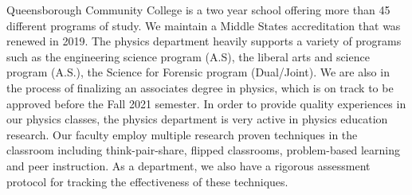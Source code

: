 \documentclass[12pt]{article}
\newcommand\new[1]{{\color{blue}#1}}
\begin{document}

Queensborough Community College is a two year school offering more than 45 different programs of study.  We maintain a Middle States accreditation that was renewed in 2019.  The physics department heavily supports a variety of programs such as the engineering science program (A.S), the liberal arts and science program (A.S.), the Science for Forensic program (Dual/Joint).  We are also in the process of \new{finalizing} an associates degree in physics\new{, which is on track to be approved before the Fall 2021 semester}.  In order to provide quality experiences in our physics classes, the physics department is very active in physics education research.  Our faculty employ multiple research proven techniques in the classroom including think-pair-share, flipped classrooms, problem-based learning and peer instruction. As a department, we also have a rigorous assessment protocol for tracking the effectiveness of these techniques.
\vspace{-5mm}
\end{document}
